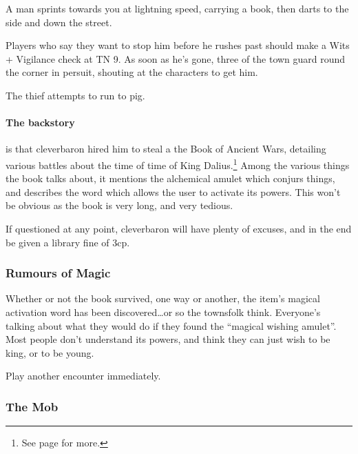 \begin{boxtext}
	A man sprints towards you at lightning speed, carrying a book, then darts to the side and down the street.
\end{boxtext}

Players who say they want to stop him before he rushes past should make a Wits + Vigilance check at TN 9.  As soon as he's gone, three of the town guard round the corner in persuit, shouting at the characters to get him.

The thief attempts to run to \gls{pig}.

\paragraph{The backstory} is that \gls{cleverbaron} hired him to steal a the Book of Ancient Wars, detailing various battles about the time of time of King Dalius.\footnote{See page \pageref{h_dalius} for more.}  Among the various things the book talks about, it mentions the alchemical amulet which conjurs things, and describes the word which allows the user to activate its powers.  This won't be obvious as the book is very long, and very tedious.

If questioned at any point, \gls{cleverbaron} will have plenty of excuses, and in the end be given a library fine of 3cp.

\subsubsection{Rumours of Magic}
Whether or not the book survived, one way or another, the item's magical activation word has been discovered\ldots or so the townsfolk think.  Everyone's talking about what they would do if they found the ``magical wishing amulet''.  Most people don't understand its powers, and think they can just wish to be king, or to be young.

Play another encounter immediately.

\subsubsection{The Mob}

